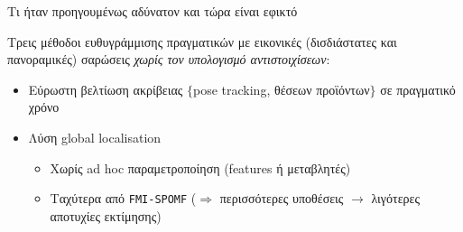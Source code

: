 \begin{frame}{Τι ήταν προηγουμένως αδύνατον και τώρα είναι εφικτό}


  \vspace{1cm}
  Τρεις μέθοδοι ευθυγράμμισης πραγματικών με εικονικές (δισδιάστατες και
  πανοραμικές) σαρώσεις \textit{χωρίς τον υπολογισμό αντιστοιχίσεων}:

  \begin{itemize}
    \item Εύρωστη βελτίωση ακρίβειας $\{$pose tracking, θέσεων προϊόντων$\}$ σε πραγματικό χρόνο
    \item Λύση global localisation
      \begin{itemize}
        \item Χωρίς ad hoc παραμετροποίηση (features ή μεταβλητές)
        \item Ταχύτερα από \texttt{FMI-SPOMF} ($\Rightarrow$ περισσότερες υποθέσεις $\rightarrow$ λιγότερες αποτυχίες εκτίμησης)
      \end{itemize}

  \end{itemize}



\end{frame}
